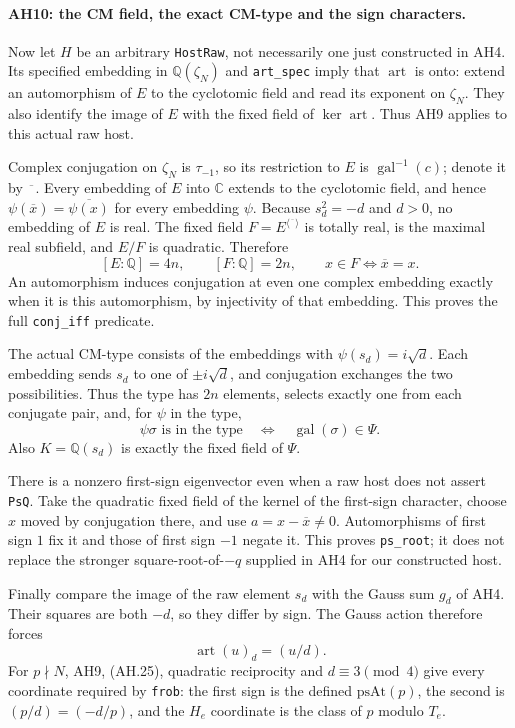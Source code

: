 \paragraph{AH10: the CM field, the exact CM-type and the sign characters.}
Now let $H$ be an arbitrary \texttt{HostRaw}, not necessarily one just
constructed in AH4. Its specified embedding in $\mathbb Q(\zeta_N)$
and \texttt{art\_spec} imply that $\operatorname{art}$ is onto: extend
an automorphism of $E$ to the cyclotomic field and read its exponent on
$\zeta_N$. They also identify the image of $E$ with the fixed field of
$\ker\operatorname{art}$. Thus AH9 applies to this actual raw host.

Complex conjugation on $\zeta_N$ is $\tau_{-1}$, so its restriction to $E$
is $\operatorname{gal}^{-1}(c)$; denote it by $\overline{\phantom{x}}$.
Every embedding of $E$ into $\mathbb C$ extends to the cyclotomic field,
and hence
$\psi(\overline{x})=\overline{\psi(x)}$ for every embedding $\psi$.
Because $s_d^2=-d$ and $d>0$, no embedding of $E$ is real. The fixed field
$F=E^{\langle\overline{\phantom{x}}\rangle}$ is totally real, is the
maximal real subfield, and $E/F$ is quadratic. Therefore
\[
 [E:\mathbb Q]=4n,\qquad [F:\mathbb Q]=2n,\qquad
 x\in F\Longleftrightarrow\overline{x}=x.        \tag{AH.23}
\]
An automorphism induces conjugation at even one complex embedding exactly
when it is this automorphism, by injectivity of that embedding. This
proves the full \texttt{conj\_iff} predicate.

The actual CM-type consists of the embeddings with
$\psi(s_d)=i\sqrt d$. Each embedding sends $s_d$ to one of
$\pm i\sqrt d$, and conjugation exchanges the two possibilities.
Thus the type has $2n$ elements, selects exactly one from each conjugate
pair, and, for $\psi$ in the type,
\[
 \psi\sigma\text{ is in the type}
       \quad\Longleftrightarrow\quad
       \operatorname{gal}(\sigma)\in\Psi.        \tag{AH.24}
\]
Also $K=\mathbb Q(s_d)$ is exactly the fixed field of $\Psi$.

There is a nonzero first-sign eigenvector even when a raw host does not
assert \texttt{PsQ}. Take the quadratic fixed field of the kernel of the
first-sign character, choose $x$ moved by conjugation there, and use
$a=x-\overline{x}\ne0$. Automorphisms of first sign $1$ fix it and those
of first sign $-1$ negate it. This proves \texttt{ps\_root}; it does not
replace the stronger square-root-of-$-q$ supplied in AH4 for our constructed
host.

Finally compare the image of the raw element $s_d$ with the Gauss sum
$g_d$ of AH4. Their squares are both $-d$, so they differ by sign. The
Gauss action therefore forces
\[
 \operatorname{art}(u)_d=(u/d).                  \tag{AH.25}
\]
For $p\nmid N$, AH9, (AH.25), quadratic reciprocity and $d\equiv3\pmod4$
give every coordinate required by \texttt{frob}: the first sign is the
defined $\mathrm{psAt}(p)$, the second is $(p/d)=(-d/p)$, and the $H_e$
coordinate is the class of $p$ modulo $T_e$.

